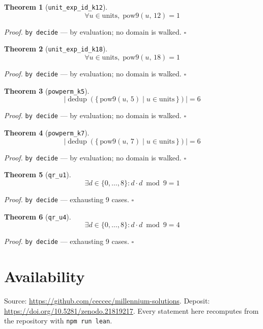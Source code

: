 \documentclass[11pt]{article}
\newtheorem{theorem}{Theorem}[section]
\begin{document}
\begin{theorem}[\texttt{unit\_exp\_id\_k12}]
\[ \forall u \in \mathrm{units},\; \mathrm{pow9}\mathopen{}\left(u,\,12\right) = 1 \]
\end{theorem}
\noindent\emph{Proof.} \texttt{by decide} --- by evaluation; no domain is walked. \hfill$\square$

\begin{theorem}[\texttt{unit\_exp\_id\_k18}]
\[ \forall u \in \mathrm{units},\; \mathrm{pow9}\mathopen{}\left(u,\,18\right) = 1 \]
\end{theorem}
\noindent\emph{Proof.} \texttt{by decide} --- by evaluation; no domain is walked. \hfill$\square$

\begin{theorem}[\texttt{powperm\_k5}]
\[ \left|\operatorname{dedup}\left(\{\, \mathrm{pow9}\mathopen{}\left(u,\,5\right) \mid u \in \mathrm{units} \,\}\right)\right| = 6 \]
\end{theorem}
\noindent\emph{Proof.} \texttt{by decide} --- by evaluation; no domain is walked. \hfill$\square$

\begin{theorem}[\texttt{powperm\_k7}]
\[ \left|\operatorname{dedup}\left(\{\, \mathrm{pow9}\mathopen{}\left(u,\,7\right) \mid u \in \mathrm{units} \,\}\right)\right| = 6 \]
\end{theorem}
\noindent\emph{Proof.} \texttt{by decide} --- by evaluation; no domain is walked. \hfill$\square$

\begin{theorem}[\texttt{qr\_u1}]
\[ \exists d \in \{0,\dots,8\} : d \cdot d \bmod 9 = 1 \]
\end{theorem}
\noindent\emph{Proof.} \texttt{by decide} --- exhausting 9 cases. \hfill$\square$

\begin{theorem}[\texttt{qr\_u4}]
\[ \exists d \in \{0,\dots,8\} : d \cdot d \bmod 9 = 4 \]
\end{theorem}
\noindent\emph{Proof.} \texttt{by decide} --- exhausting 9 cases. \hfill$\square$

\section*{Availability}
Source: \url{https://github.com/ceccec/millennium-solutions}. Deposit: \url{https://doi.org/10.5281/zenodo.21819217}.
Every statement here recomputes from the repository with \texttt{npm run lean}.
\end{document}
